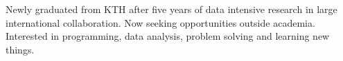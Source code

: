 

\begin{cvparagraph}

Newly graduated from KTH after five years of data intensive research in large international collaboration. 
Now seeking opportunities outside academia.
Interested in programming, data analysis, problem solving and learning new things. 

\end{cvparagraph}